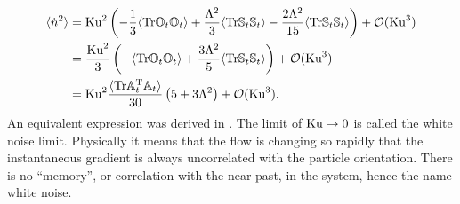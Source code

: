 \documentclass[thesis.tex]{subfiles}
\begin{document}
\begin{align}
	\langle \dot n^2\rangle &=\ku^2 \left(-\frac{1}{3}\langle\tr\ma O_t\ma O_t\rangle +  \frac{\Lambda^2}{3}\langle\tr\ma S_t \ma S_t\rangle - \frac{2\Lambda^2}{15}\langle\tr\ma S_t\ma S_t \rangle\right) + \mathcal O(\ku^3)  \nn\\
	&= \frac{\ku^2}{3}\left(-\langle\tr\ma O_t\ma O_t\rangle +  \frac{3\Lambda^2}{5}\langle\tr\ma S_t \ma S_t\rangle\right) + \mathcal O(\ku^3)  \nn\\
	&= \ku^2\frac{\langle\tr\ma A_t\transpose \ma A_t\rangle}{30}\left(5 + 3 \Lambda^2\right)+ \mathcal O(\ku^3).  \eqnlab{ku2}
\end{align}
An equivalent expression was derived in \cite{shin2005}. The limit of $\mbox{Ku}\to0$ is called the white noise limit. Physically it means that the flow is changing so rapidly that the instantaneous gradient is always uncorrelated with the particle orientation. There is no ``memory'', or correlation with the near past, in the system, hence the name white noise.
\end{document}
